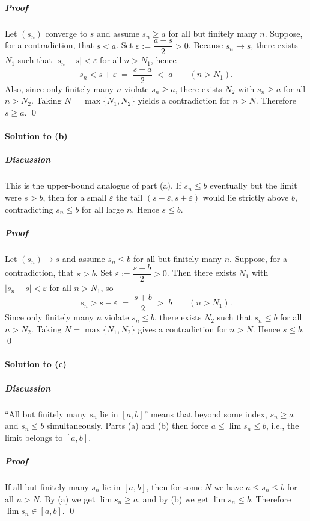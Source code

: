 \documentclass[12pt]{article}
\begin{document}
\subparagraph{Proof}
Let $(s_n)$ converge to $s$ and assume $s_n\ge a$ for all but finitely many $n$.
Suppose, for a contradiction, that $s<a$. Set $\varepsilon:=\dfrac{a-s}{2}>0$.
Because $s_n\to s$, there exists $N_1$ such that $|s_n-s|<\varepsilon$ for all $n>N_1$, hence
\[
s_n<s+\varepsilon \;=\; \frac{s+a}{2} \;<\; a \qquad(n>N_1).
\]
Also, since only finitely many $n$ violate $s_n\ge a$, there exists $N_2$ with $s_n\ge a$ for all $n>N_2$.
Taking $N=\max\{N_1,N_2\}$ yields a contradiction for $n>N$. Therefore $s\ge a$. \qed

\bigskip

\paragraph{Solution to (b)}
\subparagraph{Discussion}
This is the upper-bound analogue of part (a). If $s_n\le b$ eventually but the limit were $s>b$,
then for a small $\varepsilon$ the tail $(s-\varepsilon,s+\varepsilon)$ would lie strictly above $b$, 
contradicting $s_n\le b$ for all large $n$. Hence $s\le b$.

\subparagraph{Proof}
Let $(s_n)\to s$ and assume $s_n\le b$ for all but finitely many $n$.
Suppose, for a contradiction, that $s>b$. Set $\varepsilon:=\dfrac{s-b}{2}>0$.
Then there exists $N_1$ with $|s_n-s|<\varepsilon$ for all $n>N_1$, so
\[
s_n> s-\varepsilon \;=\; \frac{s+b}{2} \;>\; b \qquad(n>N_1).
\]
Since only finitely many $n$ violate $s_n\le b$, there exists $N_2$ such that $s_n\le b$ for all $n>N_2$.
Taking $N=\max\{N_1,N_2\}$ gives a contradiction for $n>N$. Hence $s\le b$. \qed

\bigskip

\paragraph{Solution to (c)}
\subparagraph{Discussion}
“All but finitely many $s_n$ lie in $[a,b]$” means that beyond some index, $s_n\ge a$ and $s_n\le b$ simultaneously.
Parts (a) and (b) then force $a\le \lim s_n \le b$, i.e., the limit belongs to $[a,b]$.

\subparagraph{Proof}
If all but finitely many $s_n$ lie in $[a,b]$, then for some $N$ we have $a\le s_n\le b$ for all $n>N$.
By (a) we get $\lim s_n\ge a$, and by (b) we get $\lim s_n\le b$. Therefore $\lim s_n\in[a,b]$. \qed
\end{document}
